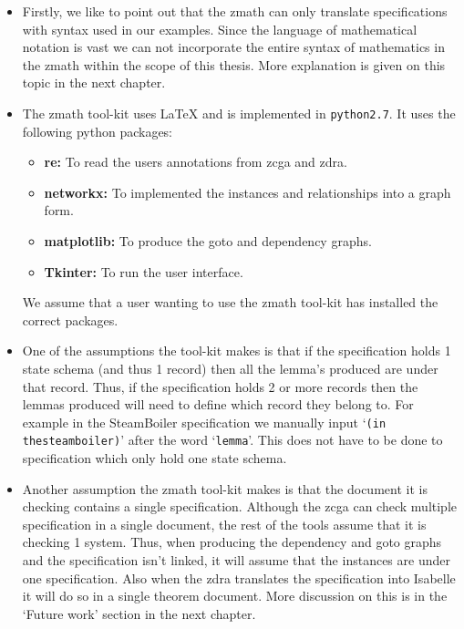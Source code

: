 \begin{itemize}
\item Firstly, we like to point out that the \gls{zmath} can only translate
specifications with syntax used in our examples. Since the language of
mathematical notation is vast we can not incorporate the entire syntax of
mathematics in the \gls{zmath} within the scope of this thesis. More explanation
is given on this topic in the next chapter.

\item The \gls{zmath} tool-kit uses \LaTeX{} and is implemented in 
\verb|python2.7|. It uses the following python packages:
\begin{itemize}
\item \textbf{re:} To read the users annotations from \gls{zcga} and \gls{zdra}.
\item \textbf{networkx:} To implemented the instances and relationships into a
graph form.
\item \textbf{matplotlib:} To produce the goto and dependency graphs.
\item \textbf{Tkinter:} To run the user interface.
\end{itemize}

We assume that a user wanting to use the \gls{zmath} tool-kit has installed the
correct packages.

\item One of the assumptions the tool-kit makes is that if the specification
holds 1 state schema (and thus 1 record) then all the lemma's produced are under
that record. Thus, if the specification holds 2 or more records then the lemmas
produced will need to define which record they belong to. For example in the
SteamBoiler specification we manually input `\verb|(in thesteamboiler)|' after
the word `\verb|lemma|'. This does not have to be done to specification which
only hold one state schema.

\item Another assumption the \gls{zmath} tool-kit makes is that the document it is
checking contains a single specification. Although the \gls{zcga} can check
multiple specification in a single document, the rest of the tools assume that
it is checking 1 system. Thus, when producing the dependency and goto graphs and
the specification isn't linked, it will assume that the instances are under one
specification. Also when the \gls{zdra} translates the specification into
Isabelle it will do so in a single theorem document. More discussion on this is
in the `Future work' section in the next chapter.


\end{itemize}
